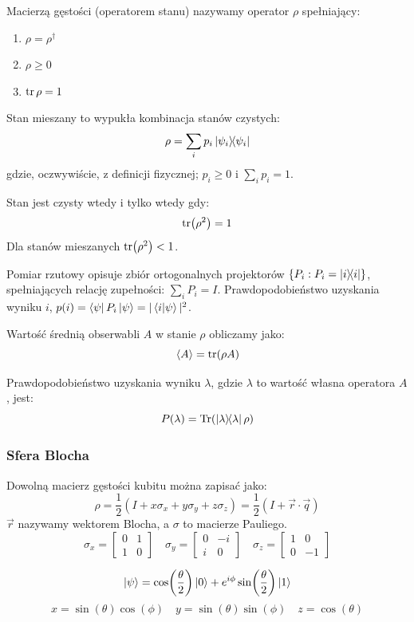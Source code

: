\documentclass{../notatki}
\begin{document}
Macierzą gęstości (operatorem stanu) nazywamy operator $\rho$ spełniający:
\begin{enumerate}
  \item $\rho = \rho^\dag$
  \item $\rho \geq 0$
  \item $\tr \rho = 1$
\end{enumerate}

Stan mieszany to wypukła kombinacja stanów czystych:
$$
\rho = \sum_i p_i \ketbra{\psi_i}{\psi_i}
$$
gdzie, oczwywiście, z definicji fizycznej; $p_i \geq 0$ i $\sum_i p_i = 1$.

Stan jest czysty wtedy i tylko wtedy gdy:
$$
\tr(\rho^2) = 1
$$
Dla stanów mieszanych $\tr(\rho^2) < 1$.

Pomiar rzutowy opisuje zbiór ortogonalnych projektorów $\{P_i : P_i =
\ketbra{i}{i}\}$, spełniających relację zupełności: $\sum_i P_i = I$.
Prawdopodobieństwo uzyskania wyniku $i$, $p(i) =
\bra{\psi}P_i\ket{\psi} = |\braket{i}{\psi}|^2$.

Wartość średnią obserwabli $A$ w stanie $\rho$ obliczamy jako:
$$
\langle A \rangle = \tr(\rho A)
$$

Prawdopodobieństwo uzyskania wyniku $\lambda$, gdzie $\lambda$ to wartość własna
operatora $A$, jest:
$$
P(\lambda) = \Tr(\ketbra{\lambda}{\lambda} \rho)
$$

\subsubsection{Sfera Blocha}

Dowolną macierz gęstości kubitu można zapisać jako:
$$
\rho = \frac{1}{2}(I + x\sigma_x + y\sigma_y + z\sigma_z) =
\frac{1}{2}(I + \vec{r} \cdot \vec{q})
$$
$\vec{r}$ nazywamy wektorem Blocha, a $\sigma$ to macierze Pauliego.
$$
\sigma_x =
\begin{bmatrix} 0 & 1 \\ 1 & 0
\end{bmatrix} \quad
\sigma_y =
\begin{bmatrix} 0 & -i \\ i & 0
\end{bmatrix} \quad
\sigma_z =
\begin{bmatrix} 1 & 0 \\ 0 & -1
\end{bmatrix}
$$

$$
\ket{\psi} = \cos(\frac{\theta}{2}) \ket{0} +
e^{i\phi}\sin(\frac{\theta}{2}) \ket{1}
$$
$$
x = \sin(\theta)\cos(\phi) \quad y = \sin(\theta)\sin(\phi) \quad z =
\cos(\theta)
$$
\end{document}
